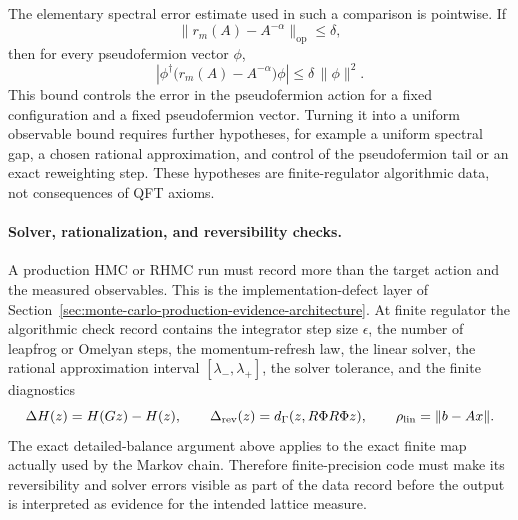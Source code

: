 The elementary spectral error estimate used in such a comparison is
pointwise.  If
\begin{equation}
  \|r_m(A)-A^{-\alpha}\|_{\mathrm{op}}\leq\delta ,
  \label{eq:rhmc-spectral-error}
\end{equation}
then for every pseudofermion vector \(\phi\),
\begin{equation}
  \left|
    \phi^\dagger\bigl(r_m(A)-A^{-\alpha}\bigr)\phi
  \right|
  \leq
  \delta\,\|\phi\|^2 .
  \label{eq:rhmc-action-error-bound}
\end{equation}
This bound controls the error in the pseudofermion action for a fixed
configuration and a fixed pseudofermion vector.  Turning it into a uniform
observable bound requires further hypotheses, for example a uniform spectral
gap, a chosen rational approximation, and control of the pseudofermion tail
or an exact reweighting step.  These hypotheses are finite-regulator
algorithmic data, not consequences of QFT axioms.

\paragraph{Solver, rationalization, and reversibility checks.}
A production HMC or RHMC run must record more than the target action and the
measured observables.  This is the implementation-defect layer of
Section~\ref{sec:monte-carlo-production-evidence-architecture}.  At finite
regulator the algorithmic check record
contains the integrator step size \(\epsilon\), the number of leapfrog or
Omelyan steps, the momentum-refresh law, the linear solver, the rational
approximation interval \([\lambda_-,\lambda_+]\), the solver tolerance, and
the finite diagnostics
\[
  \Delta H(z)=H(Gz)-H(z),\qquad
  \Delta_{\rm rev}(z)=d_\Gamma(z,R\Phi R\Phi z),
  \qquad
  \rho_{\rm lin}=\|b-Ax\| .
\]
The exact detailed-balance argument above applies to the exact finite map
actually used by the Markov chain.  Therefore finite-precision code must make
its reversibility and solver errors visible as part of the data record before
the output is interpreted as evidence for the intended lattice measure.

